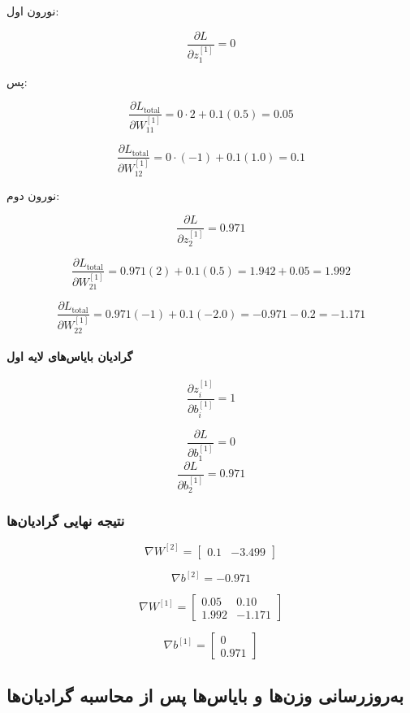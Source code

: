 \documentclass{article}
\begin{document}
نورون اول:

\[
\frac{\partial L}{\partial z^{[1]}_1}=0
\]

پس:

\[
\frac{\partial L_{\text{total}}}{\partial W^{[1]}_{11}}
=
0\cdot 2 + 0.1(0.5)
=0.05
\]

\[
\frac{\partial L_{\text{total}}}{\partial W^{[1]}_{12}}
=
0\cdot (-1) + 0.1(1.0)
=0.1
\]

نورون دوم:

\[
\frac{\partial L}{\partial z^{[1]}_2}=0.971
\]

\[
\frac{\partial L_{\text{total}}}{\partial W^{[1]}_{21}}
=
0.971(2) + 0.1(0.5)
=
1.942 + 0.05
=1.992
\]

\[
\frac{\partial L_{\text{total}}}{\partial W^{[1]}_{22}}
=
0.971(-1) + 0.1(-2.0)
=
-0.971 - 0.2
=
-1.171
\]

\paragraph*{گرادیان بایاس‌های لایه اول}

\[
\frac{\partial z^{[1]}_i}{\partial b^{[1]}_i}=1
\]

\[
\frac{\partial L}{\partial b^{[1]}_1}
=
0
\]
\[
\frac{\partial L}{\partial b^{[1]}_2}
=
0.971
\]

\subsubsection*{نتیجه نهایی گرادیان‌ها}

\[
\nabla W^{[2]} =
\begin{bmatrix}
	0.1 & -3.499
\end{bmatrix}
\]

\[
\nabla b^{[2]} = -0.971
\]

\[
\nabla W^{[1]} =
\begin{bmatrix}
	0.05 & 0.10 \\
	1.992 & -1.171
\end{bmatrix}
\]

\[
\nabla b^{[1]} =
\begin{bmatrix}
	0 \\ 0.971
\end{bmatrix}
\]



\subsection{به‌روزرسانی وزن‌ها و بایاس‌ها پس از محاسبه گرادیان‌ها}
\end{document}
